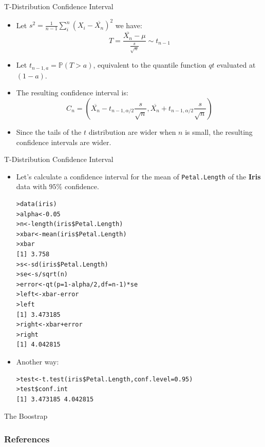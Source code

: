 \documentclass[handout]{beamer}
\begin{document}
\begin{frame}{T-Distribution Confidence Interval}

\scriptsize{
\begin{itemize}
 \item Let  $s^{2}= \frac{1}{n-1} \sum_{i}^{n}(X_{i}-\overline{X_{n}})^2$ we have:
 \begin{displaymath}
  T=\frac{\overline{X_{n}}-\mu}{\frac{s}{\sqrt{n}}}\sim t_{n-1}
 \end{displaymath}
\item  Let $t_{n-1,a}=\mathbb{P}(T>a)$, equivalent to the quantile function $qt$ evaluated at $(1-a)$.
\item The resulting confidence interval is:
       \begin{displaymath}
 C_n = (\overline{X_{n}}-t_{n-1,\alpha/2}\frac{s}{\sqrt{n}} , \overline{X_{n}} + t_{n-1,\alpha/2}\frac{s}{\sqrt{n}}) 
 \end{displaymath} 
 \item Since the tails of the $t$ distribution are wider when $n$ is small, the resulting confidence intervals are wider.

\end{itemize}


}

\end{frame}


\begin{frame}[fragile]{T-Distribution Confidence Interval}
\scriptsize{
\begin{itemize}
 \item Let's calculate a confidence interval for the mean of \verb+Petal.Length+ of the \textbf{Iris} data with $95\%$ confidence.
\begin{verbatim}
>data(iris)
>alpha<-0.05
>n<-length(iris$Petal.Length)
>xbar<-mean(iris$Petal.Length)
>xbar
[1] 3.758
>s<-sd(iris$Petal.Length)
>se<-s/sqrt(n)
>error<-qt(p=1-alpha/2,df=n-1)*se
>left<-xbar-error
>left
[1] 3.473185
>right<-xbar+error
>right
[1] 4.042815
\end{verbatim}
\item Another way:
\begin{verbatim}
>test<-t.test(iris$Petal.Length,conf.level=0.95)
>test$conf.int
[1] 3.473185 4.042815
\end{verbatim}


\end{itemize}



}
 
\end{frame}

\begin{frame}{The Boostrap}
 
\end{frame}





\begin{frame}[allowframebreaks]\scriptsize
\frametitle{References}


%
\end{frame}  









\end{document}
